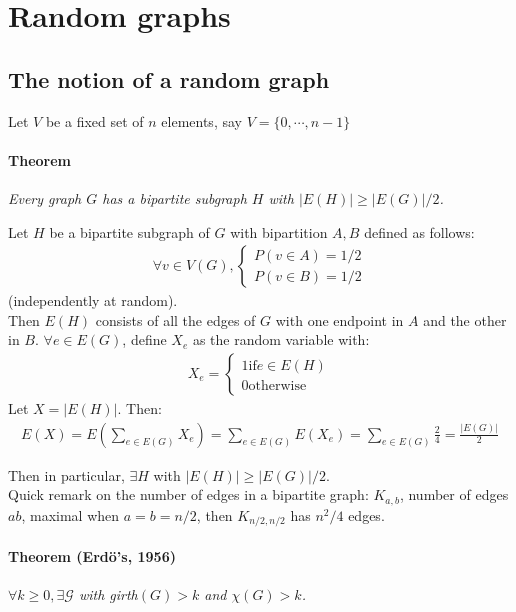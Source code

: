
\chapter{Random graphs}

\section{The notion of a random graph}
Let $V$ be a fixed set of $n$ elements, say $V = \{0, \dotsb, n-1\}$
\subsubsection{Theorem}
\textit{Every graph $G$ has a bipartite subgraph $H$ with $|E(H)| \geq |E(G)|/2$.\\}

Let $H$ be a bipartite subgraph of $G$ with bipartition $A,B$ defined as follows:
\begin{eqnarray}
	\forall v \in V(G), \begin{cases}
		P(v \in A) = 1/2 \\
		P(v \in B) = 1/2 
	\end{cases}
\end{eqnarray}
(independently at random).\\

Then $E(H)$ consists of all the edges of $G$ with one endpoint in $A$ and the other in $B$. $\forall e \in E(G)$, define $X_e$ as the random variable with:
\begin{eqnarray}
	X_e = \begin{cases}
		1 \text{if} e \in E(H)\\
		0 \text{otherwise}
	\end{cases}
\end{eqnarray}
Let $X = |E(H)|$. Then:
\begin{eqnarray}
	E(X) = E(\sum_{e \in E(G)} X_e) = \sum_{e \in E(G)} E(X_e) = \sum_{e \in E(G)} \frac{2}{4} = \frac{|E(G)|}{2}
\end{eqnarray}

Then in particular, $\exists H$ with $|E(H)| \geq |E(G)|/2$.\\

Quick remark on the number of edges in a bipartite graph: $K_{a,b}$, number of edges $ab$, maximal when $a = b = n/2$, then $K_{n/2, n/2}$ has $n^2/4$ edges.

\subsubsection{Theorem (Erdö's, 1956)}
\textit{$\forall k \geq 0, \exists \mathcal{G}$ with girth$(G) > k$ and $\chi(G) > k$.\\}

